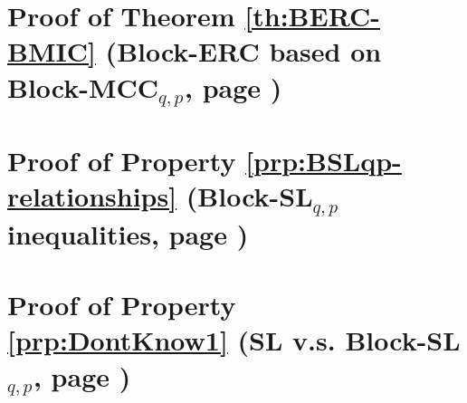 \section{Proof of Theorem \ref{th:BERC-BMIC} (Block-ERC based on Block-MCC$_{q,p}$, page \pageref{th:BERC-BMIC})}
\label{prf:BERC-BMIC} %

\newpage
\section{Proof of Property \ref{prp:BSLqp-relationships} (Block-SL$_{q,p}$ inequalities, page \pageref{prp:BSLqp-relationships})}
\label{prf:BSLqp-relationships} 

\newpage
\section{Proof of Property \ref{prp:DontKnow1} (SL v.s. Block-SL$_{q,p}$, page \pageref{prp:DontKnow1})}
\label{prf:DontKnow1} %

\newpage
